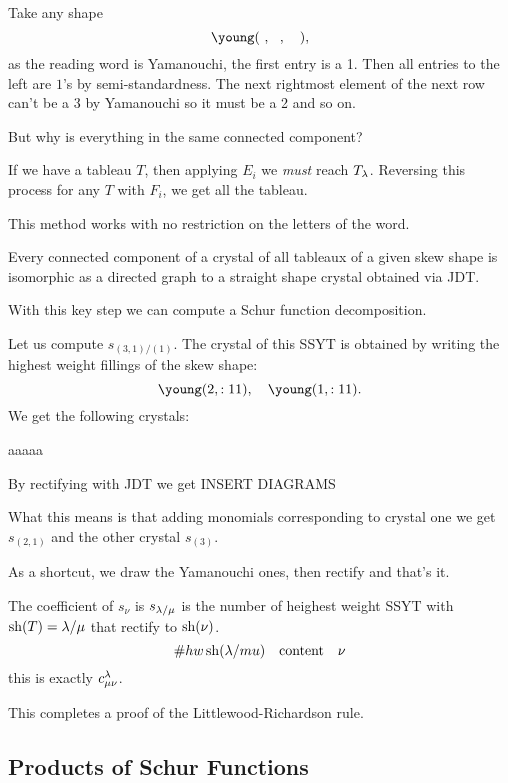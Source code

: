 \documentclass[12pt]{memoir}
\begin{document}
Take any shape 
$$\young(~,~~,~~~),$$
as the reading word is Yamanouchi, the first entry is a 1. Then all entries to the left are $1$'s by semi-standardness. The next rightmost element of the next row can't be a 3 by Yamanouchi so it must be a 2 and so on.\par 
But why is everything in the same connected component?\par 
If we have a tableau $T$, then applying $E_i$ we \emph{must} reach $T_\lambda$. Reversing this process for any $T$ with $F_i$, we get all the tableau. 

\begin{Rmk}
    This method works with no restriction on the letters of the word.
\end{Rmk}

\begin{Cor}
    Every connected component of a crystal of all tableaux of a given skew shape is isomorphic as a directed graph to a straight shape crystal obtained via JDT.
\end{Cor}

With this key step we can compute a Schur function decomposition.

\begin{Ex}
    Let us compute $s_{(3,1)/(1)}$. The crystal of this SSYT is obtained by writing the highest weight fillings of the skew shape:
    $$\young(2,:11),\quad\young(1,:11).$$
    We get the following crystals:
    \begin{center}
        aaaaa
    \end{center}
    By rectifying with JDT we get INSERT DIAGRAMS\par 
    What this means is that adding monomials corresponding to crystal one we get $s_{(2,1)}$ and the other crystal $s_{(3)}$.\par 
    As a shortcut, we draw the Yamanouchi ones, then rectify and that's it.
\end{Ex}

\begin{Cor}
    The coefficient of $s_\nu$ is $s_{\lambda/\mu}$ is the number of heighest weight SSYT with $\operatorname{sh}(T)=\lambda/\mu$ that rectify to $\operatorname{sh}(\nu)$. 
    $$\#hw\operatorname{sh}(\lambda/mu)\quad\text{content}\quad\nu$$
    this is exactly $c^\lambda_{\mu\nu}$.
\end{Cor}

This completes a proof of the Littlewood-Richardson rule. 

\subsection{Products of Schur Functions}
\end{document}
